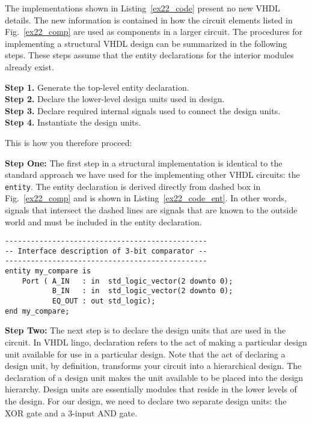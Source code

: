 The implementations shown in Listing~\ref{ex22_code} present no new VHDL details. The new information is contained in how the circuit elements listed in Fig.~\ref{ex22_comp} are used as components in a larger circuit. The procedures for implementing a structural VHDL design can be summarized in the following steps. These steps assume that the entity declarations for the interior modules already exist.

\noindent
\textbf{Step 1.} Generate the top-level entity declaration.\\
\textbf{Step 2.} Declare the lower-level design units used in design.\\
\textbf{Step 3.} Declare required internal signals used to connect the design units.\\
\textbf{Step 4.} Instantiate the design units.

This is how you therefore proceed:

\noindent
\textbf{Step One:} The first step in a structural implementation is identical to the standard approach we have used for the implementing other VHDL circuits: the \texttt{entity}. The entity declaration is derived directly from dashed box in Fig.~\ref{ex22_comp} and is shown in Listing~\ref{ex22_code_ent}. In other words, signals that intersect the dashed lines are signals that are known to the outside world and must be included in the entity declaration.

\noindent
\begin{minipage}{0.99\linewidth}
\begin{lstlisting}[label=ex22_code_ent, caption=Entity declaration for 3-bit comparator.]
-----------------------------------------------
-- Interface description of 3-bit comparator --
-----------------------------------------------
entity my_compare is
    Port ( A_IN   : in  std_logic_vector(2 downto 0);
           B_IN   : in  std_logic_vector(2 downto 0);
           EQ_OUT : out std_logic);
end my_compare;
\end{lstlisting}
\end{minipage}

\noindent
\textbf{Step Two:} The next step is to declare the design units that are used in the circuit. In VHDL lingo, declaration refers to the act of making a particular design unit available for use in a particular design. Note that the act of declaring a design unit, by definition, transforms your circuit into a hierarchical design. The declaration of a design unit makes the unit available to be placed into the design hierarchy. Design units are essentially modules that reside in the lower levels of the design. For our design, we need to declare two separate design units: the XOR gate and a 3-input AND gate.

